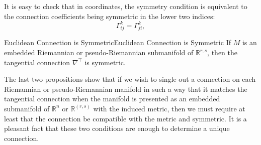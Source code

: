 \documentclass[../main.tex]{subfiles}
\begin{document}
It is easy to check that in coordinates, the symmetry condition is equivalent to the connection coefficients being symmetric in the lower two indices:
\begin{equation}
	\Gamma_{ij}^k = \Gamma_{ji}^k,
\end{equation}

\begin{proposition}{Euclidean Connection is Symmetric}{Euclidean Connection is Symmetric}
	If $M$ is an embedded Riemannian or pseudo-Riemannian submanifold of $\mathbb{R}^{r,s}$, then the tangential connection $\nabla^{\top}$ is symmetric.
\end{proposition}

\begin{remark}
	The last two propositions show that if we wish to single out a connection on each Riemannian or pseudo-Riemannian manifold in such a way that it matches the tangential connection when the manifold is presented as an embedded submanifold of $\mathbb{R}^n$ or $\mathbb{R}^{(r,s)}$ with the induced metric, then we must require at least that the connection be compatible with the metric and symmetric. It is a pleasant fact that these two conditions are enough to determine a unique connection.
\end{remark}
\end{document}
